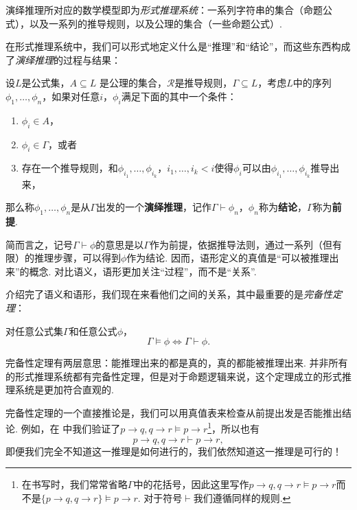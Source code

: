 演绎推理所对应的数学模型即为\emph{形式推理系统}：一系列字符串的集合（命题公式），以及一系列的推导规则，以及公理的集合（一些命题公式）. 

在形式推理系统中，我们可以形式地定义什么是“推理”和“结论”，而这些东西构成了\emph{演绎推理}的过程与结果：

\begin{definition}[演绎推理]
设$L$是公式集，$A\subseteq L$ 是公理的集合，$\mathcal R$是推导规则，$\Gamma\subseteq L$，考虑$L$中的序列$\phi_1,\dots,\phi_n$，如果对任意$i$，$\phi_i$满足下面的其中一个条件：
\begin{enumerate}
    \item $\phi_i\in A$，
    \item $\phi_i\in\Gamma$，或者
    \item 存在一个推导规则，和$\phi_{i_1},\dots,\phi_{i_k}$，$i_1,\dots,i_k<i$使得$\phi_i$可以由$\phi_{i_1},\dots,\phi_{i_k}$推导出来，
\end{enumerate}
那么称$\phi_1,\dots,\phi_n$是从$\Gamma$出发的一个\textbf{演绎推理}，记作$\Gamma\vdash\phi_n$，$\phi_n$称为\textbf{结论}，$\Gamma$称为\textbf{前提}.
\end{definition}


简而言之，记号$\Gamma\vdash\phi$的意思是以$\Gamma$作为前提，依据推导法则，通过一系列（但有限）的推理步骤，可以得到$\phi$作为结论. 因而，语形定义的真值是“可以被推理出来”的概念. 对比语义，语形更加关注“过程”，而不是“关系”.

介绍完了语义和语形，我们现在来看他们之间的关系，其中最重要的是\emph{完备性定理}：
\begin{theorem}[完备性定理]
对任意公式集$\Gamma$和任意公式$\phi$，
\[\Gamma\vDash\phi\iff\Gamma\vdash\phi.\]
\end{theorem}

完备性定理有两层意思：能推理出来的都是真的，真的都能被推理出来. 并非所有的形式推理系统都有完备性定理，但是对于命题逻辑来说，这个定理成立的形式推理系统是更加符合直观的. 

完备性定理的一个直接推论是，我们可以用真值表来检查从前提出发是否能推出结论. 例如，在 中我们验证了$p\to q,q\to r\vDash p\to r$\footnote{在书写时，我们常常省略$\Gamma$中的花括号，因此这里写作$p\to q,q\to r\vDash p\to r$而不是$\{p\to q,q\to r\}\vDash p\to r$. 对于符号$\vdash$我们遵循同样的规则.}，所以也有
\[p\to q,q\to r\vdash p\to r,\]
即便我们完全不知道这一推理是如何进行的，我们依然知道这一推理是可行的！

